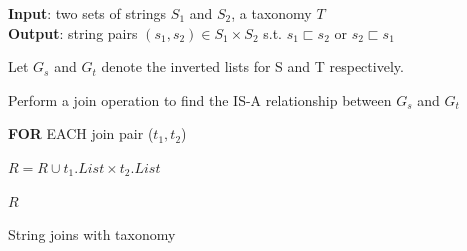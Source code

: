 

\begin{algorithm}
{\bf Input}: two sets of strings $S_1$ and $S_2$, a taxonomy $T$ \\
{\bf Output}: string pairs $(s_1,s_2) \in S_1 \times S_2$ s.t. $s_1 \sqsubset s_2$ or $s_2 \sqsubset s_1$
\begin{compactenum}[(1)]
\item Let $G_s$ and $G_t$ denote the inverted lists for S and T respectively.
\item Perform a join operation to find the IS-A relationship between $G_s$ and $G_t$
\item {\bf FOR} EACH join pair ($t_1,t_2$)
\item  $R = R \cup t_1.List \times t_2.List$
\item $R$
\end{compactenum}
\caption{String joins with taxonomy}
\label{alg:exactjoin}
\end{algorithm}

